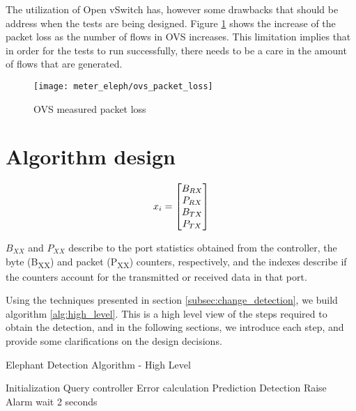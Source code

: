 \par The utilization of Open vSwitch has, however some drawbacks that should be address when the tests are being designed. Figure \ref{fig:ovs_packet_loss} shows
the increase of the packet loss as the number of flows in OVS increases. This limitation implies that in order for the tests to run successfully, there needs to be
a care in the amount of flows that are generated.

\begin{figure} [H]
    \centering
    \texttt{[image: meter\_eleph/ovs\_packet\_loss]}
    \caption {OVS measured packet loss}
    \label{fig:ovs_packet_loss}
\end{figure} 

\section {Algorithm design}

\begin {equation*}
    \centering
    x_i = 
    \begin{bmatrix}
    B_{RX}\\
    P_{RX}\\
    B_{TX}\\
    P_{TX}\\
    \end{bmatrix}
\end {equation*}

\par $B_{XX}$ and $P_{XX}$ describe to the port statistics obtained from the controller, the byte (B\textsubscript{XX}) and packet (P\textsubscript{XX}) counters, 
respectively, and the indexes describe if the counters account for the transmitted or received data in that port.

\par Using the techniques presented in section \ref{subsec:change_detection}, we build algorithm \ref{alg:high_level}. This is a high level view of the steps
required to obtain the detection, and in the following sections, we introduce each step, and provide some clarifications on the design decisions.

\begin{algorithm}[H]
    \caption{Elephant Detection Algorithm - High Level} \label{alg:high_level}
    \begin{algorithmic}[1]
            \State Initialization
            \State Query controller
            \Loop
                \State Error calculation
                \State Prediction
                \State Detection
                    \State Raise Alarm
                \EndIf
                \State wait 2 seconds
            \EndLoop
        \EndProcedure 
       \end{algorithmic}
\end{algorithm}

